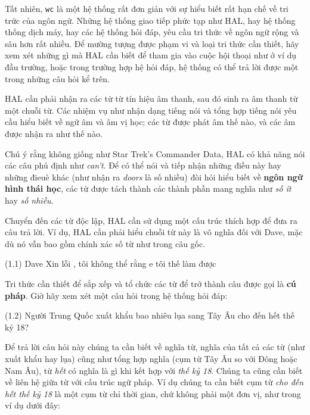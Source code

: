 Tất nhiên, \verb|wc| là một hệ thống rất đơn giản với sự hiểu biết rất hạn chế về tri trức của ngôn ngữ. Những hệ thống giao tiếp phức tạp như HAL, hay hệ thống thống dịch máy, hay các hệ thống hỏi đáp, yêu cầu tri thức về ngôn ngữ rộng và sâu hơn rất nhiều. Để mường tượng được phạm vi và loại tri thức cần thiết, hãy xem xét những gì mà HAL cần biết để tham gia vào cuộc hội thoại như ở ví dụ đầu trường, hoặc trong trường hợp hệ hỏi đáp, hệ thống có thể trả lời được một trong những câu hỏi kể trên.

HAL cần phải nhận ra các từ từ tín hiệu âm thanh, sau đó sinh ra âm thanh từ một chuỗi từ. Các nhiệm vụ như nhận dạng tiếng nói và tổng hợp tiếng nói yêu cầu hiểu biết về ngữ âm và âm vị học; các từ được phát âm thế nào, và các âm được nhận ra như thế nào.

Chú ý rằng không giống như Star Trek's Commander Data, HAL có khả năng nói các câu phủ định như \textit{can't}. Để có thể nói và tiếp nhận những điều này hay những đieuè khác (như nhận ra \textit{doors} là số nhiều) đòi hỏi hiểu biết về \textbf{ngôn ngữ hình thái học}, các từ được tách thành các thành phần mang nghĩa như \textit{số ít} hay \textit{số nhiều}.

Chuyển đến các từ độc lập, HAL cần sử dụng một cấu trúc thích hợp để đưa ra câu trả lời. Ví dụ, HAL cần phải hiểu chuỗi từ này là vô nghĩa đối với Dave, mặc dù nó vẫn bao gồm chính xác số từ như trong câu gốc.

\vspace{2mm}
\noindent
(1.1) Dave Xin lỗi , tôi không thể rằng e tôi thế làm được
\vspace{2mm}

Tri thức cần thiết để sắp xếp và tổ chức các từ để trở thành câu được gọi là \textbf{cú pháp}. Giờ hãy xem xét một câu hỏi trong hệ thống hỏi đáp:

\vspace{2mm}
\noindent
(1.2) Người Trung Quốc xuất khẩu bao nhiêu lụa sang Tây Âu cho đến hết thế kỷ 18?
\vspace{2mm}

Để trả lời câu hỏi này chúng ta cần biết về nghĩa từ, nghĩa của tất cả các từ (như xuất khẩu hay lụa) cũng như tổng hợp nghĩa (cụm từ Tây Âu so với Đông hoặc Nam Âu), từ \textit{hết} có nghĩa là gì khi kết hợp với \textit{thế kỷ 18}. Chúng ta cũng cần biết về liên hệ giữa từ với cấu trúc ngữ pháp. Ví dụ chúng ta cần biết cụm từ \textit{cho đến hết thế kỷ 18} là một cụm từ chỉ thời gian, chứ không phải một đơn vị, như trong ví dụ dưới đây:

